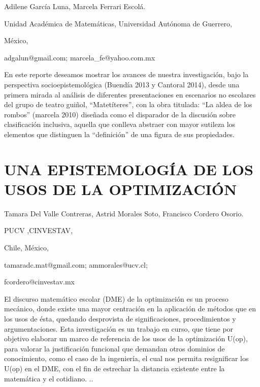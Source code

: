 \begin{datos}

Adilene García Luna, Marcela Ferrari Escolá.

Unidad Académica de Matemáticas, Universidad Autónoma de Guerrero,

México,

adgalun@gmail.com; marcela\_fe@yahoo.com.mx 

\end{datos}

En este reporte deseamos mostrar los avances de nuestra investigación,
bajo la perspectiva socioepistemológica (Buendía 2013 y Cantoral 2014),
desde una primera mirada al análisis de diferentes presentaciones
en escenarios no escolares del grupo de teatro guiñol, “Matetíteres”,
con la obra titulada: “La aldea de los rombos” (marcela 2010) diseñada
como el disparador de la discusión sobre clasificación inclusiva,
aquella que conlleva abstraer con mayor sutileza los elementos que
distinguen la “definición” de una figura de sus propiedades. 


\section{UNA EPISTEMOLOGÍA DE LOS USOS DE LA OPTIMIZACIÓN}

\begin{datos}

Tamara Del Valle Contreras, Astrid Morales Soto, Francisco Cordero
Osorio.

PUCV ,CINVESTAV,

Chile, México,

tamaradc.mat@gmail.com; ammorales@ucv.cl;

fcordero@cinvestav.mx 

\end{datos}

El discurso matemático escolar (DME) de la optimización es un proceso
mecánico, donde existe una mayor centración en la aplicación de métodos
que en los usos de ésta, quedando desprovista de significaciones,
procedimientos y argumentaciones. Esta investigación es un trabajo
en curso, que tiene por objetivo elaborar un marco de referencia de
los usos de la optimización U(op), para valorar la justificación funcional
que demandan otros dominios de conocimiento, como el caso de la ingeniería,
el cual nos permita resignificar los U(op) en el DME, con el fin de
estrechar la distancia existente entre la matemática y el cotidiano.
..


